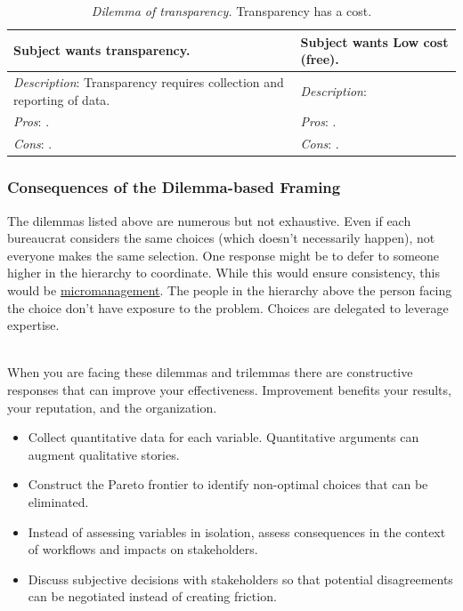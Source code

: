 \begin{center}
\begin{table}[H] %
\begin{tabular}{ | m{\dilemmatablewidth}| m{\dilemmatablewidth} | } 
  \hline
  \textbf{Subject wants transparency.} &
  \textbf{Subject wants Low cost (free).} \\
  \hline
  \textit{Description}: Transparency requires collection and reporting of data. & 
  \textit{Description}:  \\
  \hline
  \textit{Pros}: . & 
  \textit{Pros}: . \\
  \hline
  \textit{Cons}: . & 
  \textit{Cons}: . \\
  \hline
\end{tabular}
\caption{\textit{Dilemma of transparency.}
Transparency has a cost.
}
\label{table:dilemma-transparency}
\end{table}
\end{center}




\subsubsection{Consequences of the Dilemma-based Framing}

The dilemmas listed above are numerous but not exhaustive. Even if each bureaucrat considers the same choices (which doesn't necessarily happen), not everyone makes the same selection. One response might be to defer to someone higher in the hierarchy to coordinate. While this would ensure consistency, this would be \href{https://en.wikipedia.org/wiki/Micromanagement}{micromanagement}. The people in the hierarchy above the person facing the choice don't have exposure to the problem. Choices are delegated to leverage expertise. 

\ \\

When you are facing these dilemmas and trilemmas there are constructive responses that can improve your effectiveness. Improvement benefits your results, your reputation, and the organization. 
\begin{itemize}
    \item Collect quantitative data for each variable. Quantitative arguments can augment qualitative stories. 
    \item Construct the Pareto frontier to identify non-optimal choices that can be eliminated.
    \item Instead of assessing variables in isolation, assess consequences in the context of workflows and impacts on stakeholders.
    \item Discuss subjective decisions with stakeholders so that potential disagreements can be negotiated instead of creating friction.
\end{itemize}
 

